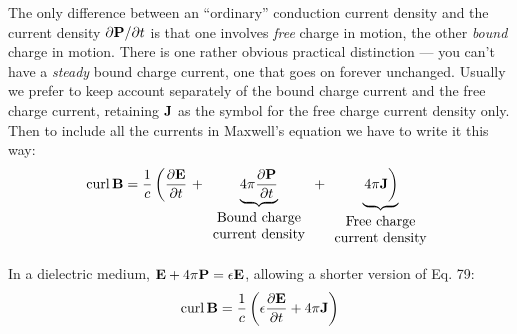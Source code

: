 The only difference between an ``ordinary'' conduction current
density and the current density $\partial\mathbf{P}/\partial t$ is that one involves \emph{free} charge
in motion, the other \emph{bound} charge in motion. There is one rather
obvious practical distinction --- you can't have a \emph{steady} bound charge
current, one that goes on forever unchanged. Usually we prefer to
keep account separately of the bound charge current and the free
charge current, retaining $\mathbf{J}$ as the symbol for the free charge current
density only. Then to include all the currents in Maxwell's equation
we have to write it this way:
\newcommand{\mycruftystrut}{\rule[-0.8\baselineskip]{0pt}{1.6\baselineskip}}
\begin{equation}
  \curl\vc{B} = \frac{1}{c} \left(
    \frac{\partial\vc{E}}{\partial t}\right.
    + \underbrace{4\pi\frac{\partial\vc{P}}{\partial t}}_{
        \begin{array}{c}\text{Bound charge}\\\text{current density}\end{array}
      }
    + \underbrace{\left.4\pi\vc{J}\mycruftystrut\right)}_{
        \begin{array}{c}\text{Free charge}\\\text{current density}\end{array}
      }
\end{equation}

In a dielectric medium, $\mathbf{E} + 4\pi\mathbf{P} = \epsilon\mathbf{E}$, allowing a shorter version
of Eq. 79:
\begin{equation}
  \operatorname{curl}\mathbf{B} = \frac{1}{c} \left(\epsilon\frac{\partial\mathbf{E}}{\partial t} + 4\pi\mathbf{J}\right)
\end{equation}

